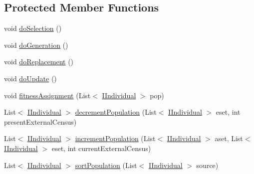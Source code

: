 \subsection*{Protected Member Functions}
\begin{DoxyCompactItemize}
\item 
void \hyperlink{classnet_1_1sf_1_1jclec_1_1algorithm_1_1multiobjective_1_1_s_p_e_a2_a897ec3445ce9e308e9dc223caa71c763}{do\-Selection} ()
\item 
void \hyperlink{classnet_1_1sf_1_1jclec_1_1algorithm_1_1multiobjective_1_1_s_p_e_a2_a18bd342add1034a773ebe31f1c0bc421}{do\-Generation} ()
\item 
void \hyperlink{classnet_1_1sf_1_1jclec_1_1algorithm_1_1multiobjective_1_1_s_p_e_a2_a0525a13d851a4fdf2c4806003bf7b292}{do\-Replacement} ()
\item 
void \hyperlink{classnet_1_1sf_1_1jclec_1_1algorithm_1_1multiobjective_1_1_s_p_e_a2_aa9f635168289cb4ad98b1b8ee139327f}{do\-Update} ()
\item 
void \hyperlink{classnet_1_1sf_1_1jclec_1_1algorithm_1_1multiobjective_1_1_s_p_e_a2_a7e28e3b8f2a40929a34ab5598bb8f0e3}{fitness\-Assignment} (List$<$ \hyperlink{interfacenet_1_1sf_1_1jclec_1_1_i_individual}{I\-Individual} $>$ pop)
\item 
List$<$ \hyperlink{interfacenet_1_1sf_1_1jclec_1_1_i_individual}{I\-Individual} $>$ \hyperlink{classnet_1_1sf_1_1jclec_1_1algorithm_1_1multiobjective_1_1_s_p_e_a2_ac621489de5878dac374cdc8d9df70c91}{decrement\-Population} (List$<$ \hyperlink{interfacenet_1_1sf_1_1jclec_1_1_i_individual}{I\-Individual} $>$ eset, int present\-External\-Census)
\item 
List$<$ \hyperlink{interfacenet_1_1sf_1_1jclec_1_1_i_individual}{I\-Individual} $>$ \hyperlink{classnet_1_1sf_1_1jclec_1_1algorithm_1_1multiobjective_1_1_s_p_e_a2_abcd25d02e19c82b0d5e01049ed856b77}{increment\-Population} (List$<$ \hyperlink{interfacenet_1_1sf_1_1jclec_1_1_i_individual}{I\-Individual} $>$ aset, List$<$ \hyperlink{interfacenet_1_1sf_1_1jclec_1_1_i_individual}{I\-Individual} $>$ eset, int current\-External\-Census)
\item 
List$<$ \hyperlink{interfacenet_1_1sf_1_1jclec_1_1_i_individual}{I\-Individual} $>$ \hyperlink{classnet_1_1sf_1_1jclec_1_1algorithm_1_1multiobjective_1_1_s_p_e_a2_ab4e2b27aa071b6a57ed704a175989a99}{sort\-Population} (List$<$ \hyperlink{interfacenet_1_1sf_1_1jclec_1_1_i_individual}{I\-Individual} $>$ source)
\end{DoxyCompactItemize}
